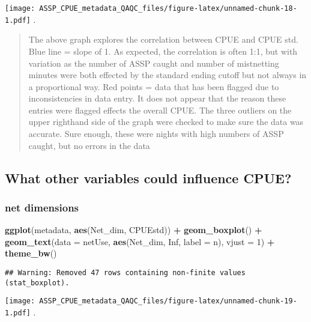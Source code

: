 \documentclass[
]{article}
\newenvironment{Shaded}{\begin{snugshade}}{\end{snugshade}}
\newcommand{\DataTypeTok}[1]{\textcolor[rgb]{0.13,0.29,0.53}{#1}}
\newcommand{\DecValTok}[1]{\textcolor[rgb]{0.00,0.00,0.81}{#1}}
\newcommand{\KeywordTok}[1]{\textcolor[rgb]{0.13,0.29,0.53}{\textbf{#1}}}
\newcommand{\NormalTok}[1]{#1}
\newcommand{\OperatorTok}[1]{\textcolor[rgb]{0.81,0.36,0.00}{\textbf{#1}}}
\newcommand{\OtherTok}[1]{\textcolor[rgb]{0.56,0.35,0.01}{#1}}
\newcommand{\StringTok}[1]{\textcolor[rgb]{0.31,0.60,0.02}{#1}}
\begin{document}
\texttt{[image: ASSP\_CPUE\_metadata\_QAQC\_files/figure-latex/unnamed-chunk-18-1.pdf]}
.

\begin{quote}
The above graph explores the correlation between CPUE and CPUE std. Blue
line = slope of 1. As expected, the correlation is often 1:1, but with
variation as the number of ASSP caught and number of mistnetting minutes
were both effected by the standard ending cutoff but not always in a
proportional way. Red points = data that has been flagged due to
inconsistencies in data entry. It does not appear that the reason these
entries were flagged effects the overall CPUE. The three outliers on the
upper righthand side of the graph were checked to make sure the data was
accurate. Sure enough, these were nights with high numbers of ASSP
caught, but no errors in the data
\end{quote}

\hypertarget{what-other-variables-could-influence-cpue}{%
\subsection{What other variables could influence
CPUE?}\label{what-other-variables-could-influence-cpue}}

\hypertarget{net-dimensions}{%
\subsubsection{net dimensions}\label{net-dimensions}}

\begin{Shaded}
\begin{Highlighting}[]
\KeywordTok{ggplot}\NormalTok{(metadata, }\KeywordTok{aes}\NormalTok{(Net_dim, CPUEstd)) }\OperatorTok{+}
\StringTok{  }\KeywordTok{geom_boxplot}\NormalTok{() }\OperatorTok{+}
\StringTok{  }\KeywordTok{geom_text}\NormalTok{(}\DataTypeTok{data =}\NormalTok{ netUse,}
            \KeywordTok{aes}\NormalTok{(Net_dim, }\OtherTok{Inf}\NormalTok{, }\DataTypeTok{label =}\NormalTok{ n), }\DataTypeTok{vjust =} \DecValTok{1}\NormalTok{) }\OperatorTok{+}
\StringTok{  }\KeywordTok{theme_bw}\NormalTok{()}
\end{Highlighting}
\end{Shaded}

\begin{verbatim}
## Warning: Removed 47 rows containing non-finite values (stat_boxplot).
\end{verbatim}

\texttt{[image: ASSP\_CPUE\_metadata\_QAQC\_files/figure-latex/unnamed-chunk-19-1.pdf]}
.
\end{document}
